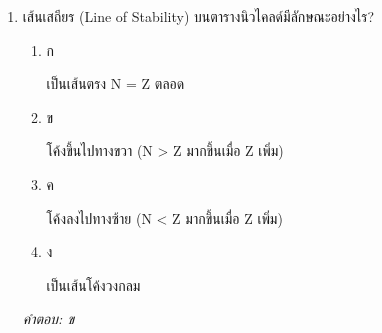 \documentclass[12pt]{article}
\begin{document}
\begin{enumerate}[label=\arabic*., itemsep=0.5\baselineskip, topsep=0.5\baselineskip, leftmargin=*]
\item เส้นเสถียร (Line of Stability) บนตารางนิวไคลด์มีลักษณะอย่างไร?
\begin{enumerate}[label=\alph*)., itemsep=0.3\baselineskip, topsep=0.3\baselineskip]
\item ก\ 
\begin{minipage}[t]{0.9\linewidth}
\raggedright เป็นเส้นตรง N = Z ตลอด
\end{minipage}
\item ข\ 
\begin{minipage}[t]{0.9\linewidth}
\raggedright โค้งขึ้นไปทางขวา (N > Z มากขึ้นเมื่อ Z เพิ่ม)
\end{minipage}
\item ค\ 
\begin{minipage}[t]{0.9\linewidth}
\raggedright โค้งลงไปทางซ้าย (N < Z มากขึ้นเมื่อ Z เพิ่ม)
\end{minipage}
\item ง\ 
\begin{minipage}[t]{0.9\linewidth}
\raggedright เป็นเส้นโค้งวงกลม
\end{minipage}
\end{enumerate}
\vspace{-0.3\baselineskip}
\begin{small}
\textit{คำตอบ: ข}
\end{small}

\end{enumerate}
\end{document}
